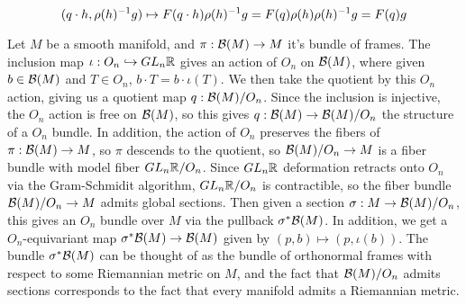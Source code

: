 \[
(q \cdot h, \rho(h)^{-1} g) \mapsto F(q \cdot h)\rho(h)^{-1} g = F(q)\rho(h)\rho(h)^{-1} g
= F(q)g
\]
%
\begin{exmp}
Let $M$ be a smooth manifold, and $\pi : \mathcal{B}(M) \to M$ it's bundle of frames.
The inclusion map $\iota: O_n \hookrightarrow GL_n\mathbb{R}$ gives an action of $O_n$ on
$\mathcal{B}(M)$, where given $b \in \mathcal{B}(M)$ and $T \in O_n$, $b \cdot T = b \cdot \iota(T)$.
We then take the quotient by this $O_n$ action, giving us a quotient map
$q : \mathcal{B}(M) / O_n$. Since the inclusion is injective, the $O_n$ action
is free on $\mathcal{B}(M)$, so this gives $q : \mathcal{B}(M) \to \mathcal{B}(M) / O_n$ the structure of a
$O_n$ bundle. In addition, the action of $O_n$ preserves the fibers of
$\pi : \mathcal{B}(M) \to M$, so $\pi$ descends to the quotient, so $\mathcal{B}(M) / O_n \to M$
is a fiber bundle with model fiber $GL_n\mathbb{R} / O_n$. Since $GL_n\mathbb{R}$ deformation
retracts onto $O_n$ via the Gram-Schmidit algorithm, $GL_n\mathbb{R} / O_n$ is
contractible, so the fiber bundle $\mathcal{B}(M)/ O_n \to M$ admits global sections.
Then given a section $\sigma : M \to \mathcal{B}(M) / O_n$, this gives an $O_n$ bundle
over $M$ via the pullback $\sigma^*\mathcal{B}(M)$. In addition, we get a $O_n$-equivariant
map $\sigma^*\mathcal{B}(M) \to \mathcal{B}(M)$ given by $(p, b) \mapsto (p, \iota(b))$. The
bundle $\sigma^*\mathcal{B}(M)$ can be thought of as the bundle of orthonormal frames
with respect to some Riemannian metric on $M$, and the fact that $\mathcal{B}(M) / O_n$
admits sections corresponds to the fact that every manifold admits a Riemannian
metric.
\end{exmp}
%

